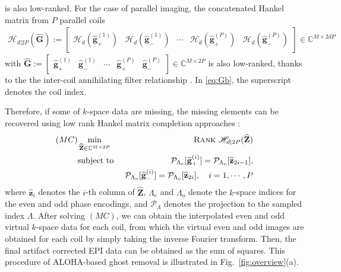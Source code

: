 \documentclass[num-refs]{wiley-article}
\newcommand{\Gb}{{\mathbf G}}
\newcommand{\Zb}{{\mathbf Z}}
\newcommand{\gb}{{\mathbf g}}
\newcommand{\zb}{{\mathbf z}}
\newcommand{\Cd}{{\mathbb C}}
\newcommand{\0}{{\boldsymbol{0}}}
\newcommand{\Pc}{{{\mathcal P}}}
\newcommand{\rank}{\textsc{Rank}}
\newcommand{\hank}{\mathscr{H}}
\newcommand{\1}{\blmath{1}}
\begin{document}
	is also low-ranked. For the case of parallel imaging,   the concatenated Hankel matrix from $P$ parallel coils 
	\begin{eqnarray}\label{eq:Gb}
	\hank_{d|2P}(\widehat\Gb) :=
	\begin{bmatrix} \hank_d\left(\widehat \gb_+^{(1)}\right) &\hank_d\left(\widehat \gb_-^{(1)}\right)  & \cdots & \hank_d\left(\widehat \gb_+^{(P)}\right)& \hank_d\left(\widehat \gb_-^{(P)}\right)\end{bmatrix}   \in \Cd^{M\times {2dP}}
	\end{eqnarray}
	with %
	$\widehat\Gb:=\begin{bmatrix} \widehat\gb_+^{(1)} & \widehat\gb_-^{(1)} & \cdots &\widehat\gb_+^{(P)} & \widehat\gb_-^{(P)} \end{bmatrix} \in \Cd^{M\times 2P}$
	is also low-ranked, thanks to the the inter-coil annihilating filter relationship  \cite{jin2016general,Lee2016reference}.
	In \eqref{eq:Gb},  the superscript denotes the coil index.
	
	
	Therefore, if some of $k$-space data  are missing,
	the missing elements can be recovered using low rank Hankel matrix completion approaches \cite{jin2016general,ye2017compressive,lee2016acceleration,Lee2016reference,candes2009exact,cai2010singular,candes2010power,gross2011recovering,keshavan2010matrix}:
	\begin{eqnarray}\label{eq:EMaC}
	(MC)
	&\min\limits_{\widehat \Zb\in \Cd^{M \times 2P}} & \rank~ \hank_{d|2P} (\widehat \Zb)  \\
	&\mbox{subject to } & \Pc_{\Lambda_e}[\widehat\gb_+^{(i)}] = \Pc_{\Lambda_e}[\widehat \zb_{2i-1}]  , \\
	&& \Pc_{\Lambda_o}[\widehat\gb_-^{(i)}] = \Pc_{\Lambda_o}[\widehat \zb_{2i}]  ,\quad i=1,\cdots, P \nonumber 
	\end{eqnarray}
	where $\widehat\zb_i$ denotes the $i$-th column of $\widehat\Zb$, $\Lambda_e$ and $\Lambda_o$ denote the $k$-space indices for the even and odd phase encodings, and $\Pc_\Lambda$ denotes the projection to the sampled index $\Lambda$. After solving $(MC)$,  we can obtain the interpolated even and odd virtual $k$-space data for each coil, from which the virtual even and odd images are obtained for each coil by simply taking the inverse Fourier transform.
	Then, the final artifact corrected EPI data can be obtained as the sum of squares. This  procedure of ALOHA-based ghost removal is illustrated in Fig.~\ref{fig:overview}(a).
	
\end{document}
